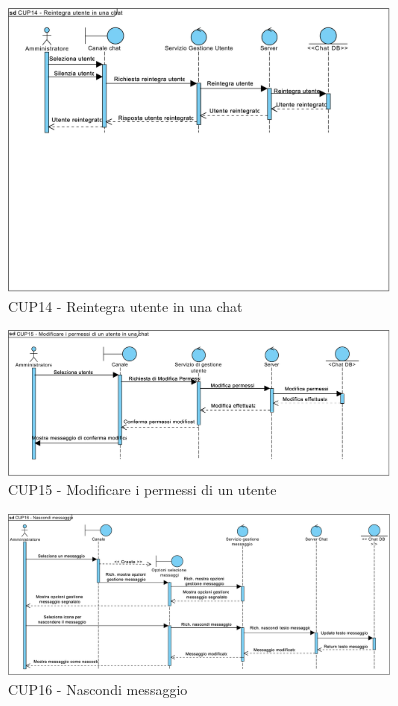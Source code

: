 \begin{figure}
	\centering
	\includegraphics[width=0.9\textwidth]{imgs/gruppo6/sequence/CUP14_reintegra_utente_in_una_chat.pdf}
	\caption{CUP14 - Reintegra utente in una chat}
	\label{fig:seq-cup14}
\end{figure}

\begin{figure}
	\centering
	\includegraphics[width=0.9\textwidth]{imgs/gruppo6/sequence/CUP15_modificare_i_permessi_di_un_utente.pdf}
	\caption{CUP15 - Modificare i permessi di un utente}
	\label{fig:seq-cup15}
\end{figure}

\begin{figure}
	\centering
	\includegraphics[width=0.9\textwidth]{imgs/gruppo6/sequence/CUP16_nascondi_messaggio.pdf}
	\caption{CUP16 - Nascondi messaggio}
	\label{fig:seq-cup16}
\end{figure}

